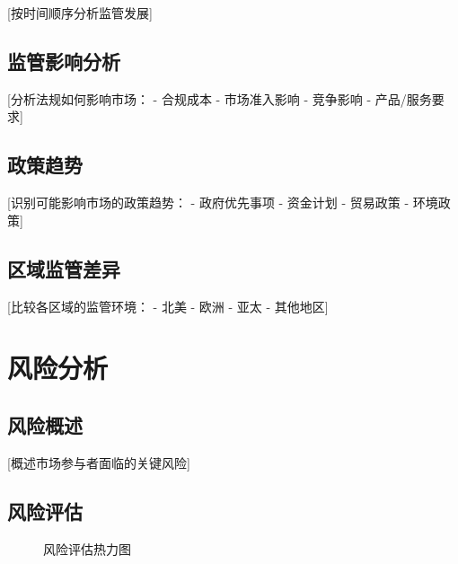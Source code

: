 \documentclass[11pt,letterpaper]{report}
\begin{document}
{[按时间顺序分析监管发展]

\section{监管影响分析}

[分析法规如何影响市场：
- 合规成本
- 市场准入影响
- 竞争影响
- 产品/服务要求]

\section{政策趋势}

[识别可能影响市场的政策趋势：
- 政府优先事项
- 资金计划
- 贸易政策
- 环境政策]

\section{区域监管差异}

[比较各区域的监管环境：
- 北美
- 欧洲
- 亚太
- 其他地区]

\chapter{风险分析}

\section{风险概述}

[概述市场参与者面临的关键风险]

\section{风险评估}


\begin{figure}[htbp]
\centering
\caption{风险评估热力图}
\label{fig:risk_heatmap}
\end{figure}

}
\end{document}
